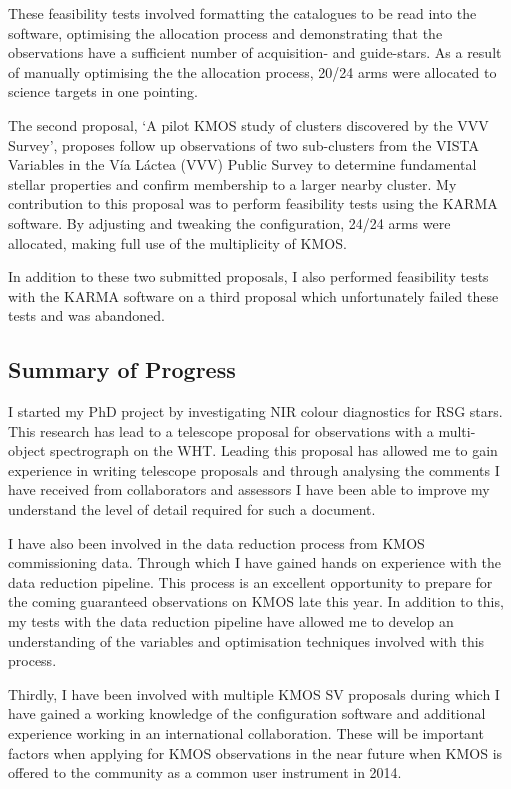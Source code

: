 \documentclass[a4paper,12pt]{article}
\begin{document}
These feasibility tests involved formatting the catalogues to be read into the software, optimising the allocation process and demonstrating that the observations have a sufficient number of acquisition- and guide-stars. 
As a result of manually optimising the the allocation process, 20/24 arms were allocated to science targets in one pointing. 

The second proposal, \textquoteleft A pilot KMOS study of clusters discovered by the VVV Survey\textquoteright, proposes follow up observations of two sub-clusters from the VISTA Variables in the V\'ia L\'actea (VVV) Public Survey to determine fundamental stellar properties and confirm membership to a larger nearby cluster. 
My contribution to this proposal was to perform feasibility tests using the KARMA software. 
By adjusting and tweaking the configuration, 24/24 arms were allocated, making full use of the multiplicity of KMOS.

In addition to these two submitted proposals, I also performed feasibility tests with the KARMA software on a third proposal which unfortunately failed these tests and was abandoned. 

\subsection{Summary of Progress}

I started my PhD project by investigating NIR colour diagnostics for RSG stars. 
This research has lead to a telescope proposal for observations with a multi-object spectrograph on the WHT. 
Leading this proposal has allowed me to gain experience in writing telescope proposals and through analysing the comments I have received from collaborators and assessors I have been able to improve my understand the level of detail required for such a document.  

I have also been involved in the data reduction process from KMOS commissioning data.
Through which I have gained hands on experience with the data reduction pipeline. 
This process is an excellent opportunity to prepare for the coming guaranteed observations on KMOS late this year. 
In addition to this, my tests with the data reduction pipeline have allowed me to develop an understanding of the variables and optimisation techniques involved with this process. 

Thirdly, I have been involved with multiple KMOS SV proposals during which I have gained a working knowledge of the configuration software and additional experience working in an international collaboration.
These will be important factors when applying for KMOS observations in the near future when KMOS is offered to the community as a common user instrument in 2014. 
\end{document}
